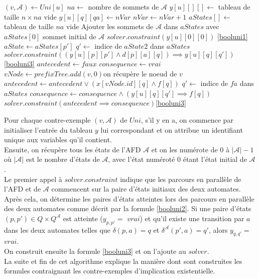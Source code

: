 \documentclass[12pt,a4paper,oneside,titlepage]{report}
\begin{document}
\begin{algorithm}[H]
\begin{algorithmic}[1]
		\State $(v,\mathcal{A})\gets Uni[u]$
		\State $na\gets$ nombre de sommets de $\mathcal{A}$
		\State $y[u][][]\gets$ tableau de taille $n\times na$ vide
				\State $y[u][q][qa]\gets nVar$
				\State $nVar\gets nVar+1$
			\EndFor
		\EndFor
		\State $aStates[]\gets$ tableau de taille $na$ vide
		\State Ajouter les sommets de $\mathcal{A}$ dans $aStates$ avec $aStates[0]$ sommet initial de $\mathcal{A}$
		\State $solver.constraint(y[u][0][0])$ \Comment\ref{booluni1}
			\State $aState\gets aStates[p']$
				\State $q'\gets$ indice de $aState2$ dans $aStates$
						\State $solver.constraint((y[u][p][p']\land d[p][a][q])\implies y[u][q][q'])$\Comment\ref{booluni3}
					\EndFor
				\EndFor				
			\EndFor
		\EndFor
		\State $antecedent\gets faux$
		\State $consequence\gets vrai$
		\State $vNode\gets prefixTree.add(v,0)$\Comment on récupère le noeud de $v$
			\State $antecedent\gets antecedent\lor (x[vNode.id][q]\land f[q])$
				\State $q'\gets$ indice de $fa$ dans $aStates$
				\State $consequence\gets consequence\land (y[u][q][q']\implies f[q])$
			\EndFor
		\EndFor
		\State $solver.constraint(antecedent\implies consequence)$\Comment\ref{booluni3}
	\EndFor
\EndIf
{}
\end{algorithmic}
\end{algorithm}
\noindent Pour chaque contre-exemple $(v,\mathcal{A})$ de $Uni$, s'il y en a, on commence par initialiser l'entrée du tableau $y$ lui correspondant et on attribue un identifiant unique aux variables qu'il contient.\\
Ensuite, on récupère tous les états de l'AFD $\mathcal{A}$ et on les numérote de $0$ à $|\mathcal{A}|-1$ où $|\mathcal{A}|$ est le nombre d'états de $\mathcal{A}$, avec l'état numéroté $0$ étant l'état initial de $\mathcal{A}$.\\
Le premier appel à $solver.constraint$ indique que les parcours en parallèle de l'AFD et de $\mathcal{A}$ commencent sur la paire d'états initiaux des deux automates.\\
Après cela, on détermine les paires d'états atteintes lors des parcours en parallèle des deux automates comme décrit par la formule \ref{booluni2}. Si une paire d'états $(p,p')\in Q\times Q^\mathcal{A}$ est atteinte ($y_{p,p'}=$ $vrai$) et qu'il existe une transition par $a$ dans les deux automates telles que $\delta(p,a)=q$ et $\delta^\mathcal{A}(p',a)=q'$, alors $y_{q,q'}=$ $vrai$.\\
\noindent On construit ensuite la formule \ref{booluni3} et on l'ajoute au $solver$.\\
\noindent La suite et fin de cet algorithme explique la manière dont sont construites les formules contraignant les contre-exemples d'implication existentielle.
\end{document}
